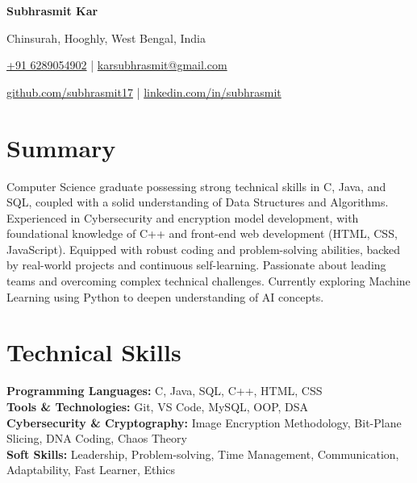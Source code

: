 \documentclass[a4paper,10pt]{article}
\newcommand{\sectionspacing}{\vspace{0.09em}}
\begin{document}
\begin{center}
    {\fontsize{22}{24}\selectfont\textbf{Subhrasmit Kar}} \par
    
    \vspace{-0.3em}
    
    Chinsurah, Hooghly, West Bengal, India \par
    
    \vspace{-0.3em}
    
    \href{tel:+916289054902}{+91 6289054902} \quad | \quad \href{mailto:karsubhrasmit@gmail.com}{karsubhrasmit@gmail.com} \par
    
    \vspace{-0.5em}
    
    \href{https://github.com/subhrasmit17}{github.com/subhrasmit17} \quad | \quad \href{https://linkedin.com/in/subhrasmit}{linkedin.com/in/subhrasmit}
\end{center}

\sectionspacing

\section*{Summary}
Computer Science graduate possessing strong technical skills in C, Java, and SQL, coupled with a solid understanding of Data Structures and Algorithms. Experienced in Cybersecurity and encryption model development, with foundational knowledge of C++ and front-end web development (HTML, CSS, JavaScript). Equipped with robust coding and problem-solving abilities, backed by real-world projects and continuous self-learning. Passionate about leading teams and overcoming complex technical challenges. Currently exploring Machine Learning using Python to deepen understanding of AI concepts.

\sectionspacing

\section*{Technical Skills}
\textbf{Programming Languages:} C, Java, SQL, C++, HTML, CSS \\[0.5em]
\textbf{Tools \& Technologies:} Git, VS Code, MySQL, OOP, DSA \\[0.5em]
\textbf{Cybersecurity \& Cryptography:} Image Encryption Methodology, Bit-Plane Slicing, DNA Coding, Chaos Theory \\[0.5em]
\textbf{Soft Skills:} Leadership, Problem-solving, Time Management, Communication, Adaptability, Fast Learner, Ethics
\end{document}
